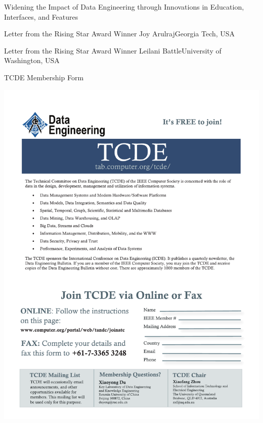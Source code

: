 \documentclass[11pt]{article}
\begin{document}
\begin{bulletin}
\begin{articlesection}{Widening the Impact of Data Engineering through Innovations in Education, Interfaces, and Features}
\end{articlesection}

\begin{awardsection}
\begin{award}{Letter from the Rising Star Award Winner}
{Joy Arulraj}{Georgia Tech, USA}

\end{award}
\newpage
\begin{award}{Letter from the Rising Star Award Winner}
{Leilani Battle}{University of Washington, USA}

\end{award}
\end{awardsection}


\begin{callsection}

%
%
\begin{call}{TCDE Membership Form}
\centerline{\includegraphics[width=\textwidth, bb= 0 0 590 760] {tcde.pdf}}
\end{call}

\end{callsection}

\end{bulletin}
\end{document}
